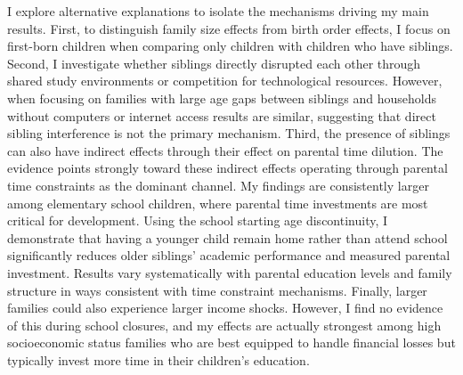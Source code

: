 I explore alternative explanations to isolate the mechanisms driving my main results. First, to distinguish family size effects from birth order effects, I focus on first-born children when comparing only children with children who have siblings. Second, I investigate whether siblings directly disrupted each other through shared study environments or competition for technological resources. However, when focusing on families with large age gaps between siblings and households without computers or internet access results are similar, suggesting that direct sibling interference is not the primary mechanism. Third, the presence of siblings can also have indirect effects through their effect on parental time dilution. The evidence points strongly toward these indirect effects operating through parental time constraints as the dominant channel. My findings are consistently larger among elementary school children, where parental time investments are most critical for development. Using the school starting age discontinuity, I demonstrate that having a younger child remain home rather than attend school significantly reduces older siblings' academic performance and measured parental investment. Results vary systematically with parental education levels and family structure in ways consistent with time constraint mechanisms. Finally, larger families could also experience larger income shocks. However, I find no evidence of this during school closures, and my effects are actually strongest among high socioeconomic status families who are best equipped to handle financial losses but typically invest more time in their children's education.

